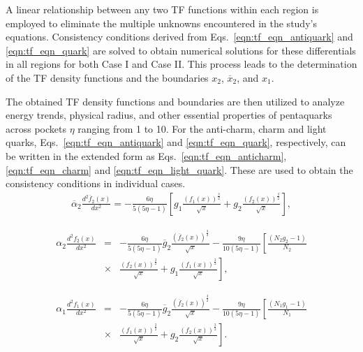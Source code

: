 \documentclass[preprint,12pt]{elsarticle}
\begin{document}
        A linear relationship between any two TF functions within each region is employed to eliminate the multiple unknowns encountered in the study's equations. Consistency conditions derived from Eqs.~\eqref{eqn:tf_eqn_antiquark} and \eqref{eqn:tf_eqn_quark} are solved to obtain numerical solutions for these differentials in all regions for both Case I and Case II. This process leads to the determination of the TF density functions and the boundaries $x_2$, $\overline{x}_{2}$, and $x_1$. 
        
        The obtained TF density functions and boundaries are then utilized to analyze energy trends, physical radius, and other essential properties of pentaquarks across pockets $\eta$ ranging from 1 to 10.
        For the anti-charm, charm and light quarks, Eqs.~\eqref{eqn:tf_eqn_antiquark} and \eqref{eqn:tf_eqn_quark}, respectively, can be written in the extended form as Eqs.~\eqref{eqn:tf_eqn_anticharm}, \eqref{eqn:tf_eqn_charm} and \eqref{eqn:tf_eqn_light_quark}. These are used to obtain the consistency conditions in individual cases.
        \begin{eqnarray}
             \overline{\alpha}_2 \frac{d^2\overline{f}_{2}(x)}{dx^2}= -\frac{6\eta}{5(5\eta-1)} \left[ g_1 \frac{(f_1(x))^\frac{3}{2}}{\sqrt{x}}
             +  g_2 \frac{(f_2(x))^\frac{3}{2}}{\sqrt{x}} \right],
             \label{eqn:tf_eqn_anticharm}
        \end{eqnarray}
        
        \begin{eqnarray}
            \alpha_2 \frac{d^2 f_2(x)}{dx^2} &=&-\frac{6\eta}{5(5\eta-1)}    \overline{g}_{2} \frac{\left( \overline{f}_{2}(x) \right)^\frac{3}{2}}{\sqrt{x}} 
            - \frac{9\eta}{10(5\eta-1)}\left[\frac{(N_2 g_2-1)}{N_2} \right. \nonumber \\ 
            &\times& \frac{\left( f_2(x) \right)^\frac{3}{2}}{\sqrt{x}}
            + \left. g_1 \frac{\left( f_1(x) \right)^\frac{3}{2}}{\sqrt{x}} \right],
            \label{eqn:tf_eqn_charm}
        \end{eqnarray}
        
        \begin{eqnarray}
            \alpha_1 \frac{d^2 f_1(x)}{dx^2} &=& -\frac{6 \eta}{5(5 \eta -1)}\overline{g}_{2} \frac{(\overline{f}_{2}(x))^\frac{3}{2}}{\sqrt{x}}
            -\frac{9\eta}{10(5\eta-1)}\left[\frac{(N_1 g_1-1)}{N_1} \right. \nonumber \\ 
            &\times& \frac{\left( f_1(x) \right)^\frac{3}{2}}{\sqrt{x}}
            + \left. g_2 \frac{\left( f_2(x) \right)^\frac{3}{2}}{\sqrt{x}} \right].
            \label{eqn:tf_eqn_light_quark}
        \end{eqnarray}
        
\end{document}
